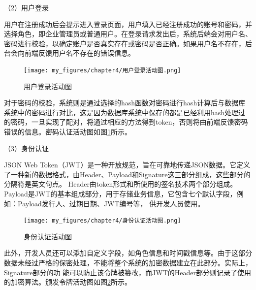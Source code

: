 （2）用户登录



用户在注册成功后会提示进入登录页面，用户填入已经注册成功的账号和密码，并选择角色，即企业管理员或普通用户。在登录请求发出后，系统后端会对用户名、
密码进行校验，以确定账户是否真实存在或密码是否正确。如果用户名不存在，后台会向前端反馈用户名不存在的错误信息。

\begin{figure}[h]
    \centering
    \texttt{[image: my\_figures/chapter4/用户登录活动图.png]}
    \caption{用户登录活动图}
    \label{fig:用户登录活动图}
\end{figure}

对于密码的校验，系统则是通过选择的hash函数对密码进行hash计算后与数据库系统中的密码进行对比，这是因为数据库系统中保存的都是已经利用hash处理过
的密码，一旦实现了配对，将通过相应的方法得到token，否则将由前端反馈密码错误的信息。密码认证活动图如图\ref{fig:用户登录活动图}所示。


（3）身份认证

JSON Web Token（JWT）是一种开放规范，旨在可靠地传递JSON数据。它定义了一种新的数据格式，由Header、Payload和Signature这三部分组成，这些部分的分隔符是英文句点。
Header由token形式和所使用的签名技术两个部分组成。Payload是JWT的基本组成部分，用于存储业务信息，它包含七个默认字段，例如：Payload发行人、过期日期、JWT编号等，
供开发人员使用。
\begin{figure}[htb]
    \centering
    \texttt{[image: my\_figures/chapter4/身份认证活动图.png]}
    \caption{身份认证活动图}
    \label{fig:身份认证活动图}
\end{figure}
此外，开发人员还可以添加自定义字段，如角色信息和时间戳信息等。由于这部分数据未经过严格的保密处理，不能将整个系统的加密数据建立在此部分。实际上，Signature部分的功
能可以防止该令牌被篡改，而JWT的Header部分则记录了使用的加密算法。颁发令牌活动图如图\ref{fig:身份认证活动图}所示。





